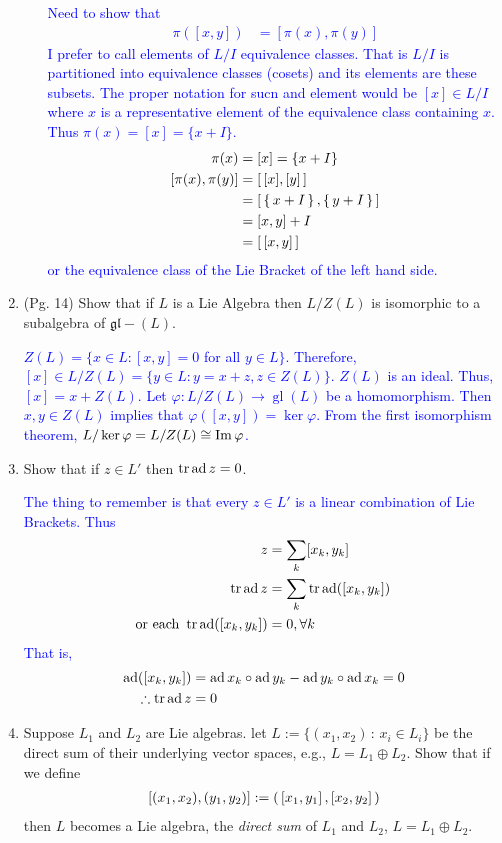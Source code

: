 \documentclass[12pt,a4paper]{report}
\newcommand{\BLUE}[1]{\textcolor{blue}{#1}}
\newcommand{\GL}{\operatorname{gl}}
\newcommand{\AD}{\operatorname{ad}}
\newcommand{\LB}[2]{\left [ #1,#2 \right ]}
\begin{document}
\begin{enumerate}[label=2.\arabic*]
\begin{enumerate}[label=(\roman*)]
	\BLUE{Need to show that 
	\begin{align*}
		\pi([x,y]) &= [\pi(x),\pi(y)]
	\end{align*}	I prefer to call elements of $L/I$ equivalence classes.  That is $L/I$ is partitioned into equivalence classes (cosets) and its elements are these subsets.  The proper notation for sucn and element would be $[x] \in L/I$ where $x$ is a representative element of the equivalence class containing $x$.  Thus $\pi(x) = [x] = \{x+I\}$.
	\begin{align*}
		\pi(x) &= [x] = \{x+I\}\\
		[\pi(x),\pi(y)] &= \left [\, [x],[y] \,\right ] \\
		&= \left [\, \left \{\, x+I \,\right \}, \left \{\, y+I \,\right \} \,\right ] \\
		&= [x,y] +I \\
		&= \left [\, [x,y] \,\right ]
\end{align*}	or the equivalence class of the Lie Bracket of the left hand side.
	}

\end{enumerate}

\item (Pg. 14) Show that if $L$ is a Lie Algebra then $L/Z(L)$ is isomorphic to a subalgebra of $\mathfrak{gl}-(L)$.

\BLUE{$Z(L) = \{x \in L: [x,y]=0$ for all $y\in L\}$.  Therefore, $[x]\in L/Z(L) = \{y\in L : y=x+z, z \in Z(L) \}$.  $Z(L)$ is an ideal.  Thus, $[x] = x +Z(L)$.  Let $\varphi : L/Z(L) \to \GL(L)$ be a homomorphism.  Then $x,y \in Z(L)$ implies that $\varphi([x,y]) = \ker \varphi$.  From the first isomorphism theorem, $L/\ker \varphi = L/Z(L) \cong \operatorname{Im} \varphi$. 
}

\item Show that if $z \in L'$ then $\TR \AD z = 0$.

\BLUE{The thing to remember is that every $z \in L'$ is a linear combination of Lie Brackets.  Thus
\begin{align*}
	z &= \sum_k [x_k, y_k] \\
	\TR \AD z &= \sum_k \TR \AD ([x_k, y_k]) \\
	\text{or each } \TR \AD ([x_k, y_k])&=0, \forall k
\end{align*}That is, 
\begin{align*}
	\AD ([x_k,y_k]) &= \AD x_k\circ \AD y_k - \AD y_k\circ \AD x_k = 0 \\
	\therefore \TR \AD z &= 0
\end{align*}
}

\item Suppose $L_1$ and $L_2$ are Lie algebras.  let $L := \{(x_1,x_2)\,:\, x_i \in L_i\}$ be the direct sum of their underlying vector spaces, e.g., $L = L_1 \oplus L_2$.  Show that if we define
\begin{align*}
	\LB{(x_1,x_2)}{(y_1,y_2)} := \PAREN{\LB{x_1}{y_1},\LB{x_2}{y_2}}
\end{align*}then $L$ becomes a Lie algebra, the \textit{direct sum} of $L_1$ and $L_2$, $L = L_1 \oplus L_2$.  
\begin{enumerate}[label=(\roman*)]


\end{enumerate}
\end{enumerate}
\end{document}
